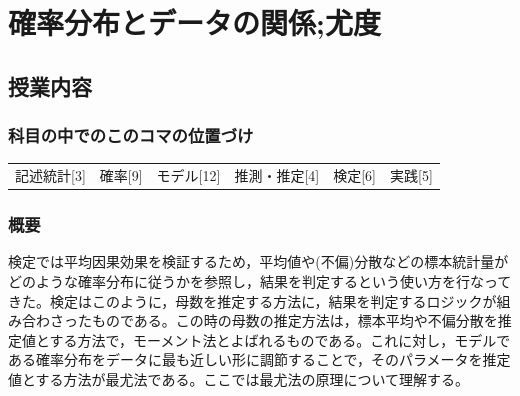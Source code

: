 \section{確率分布とデータの関係;尤度}
\label{s23_likelihood}

\subsection{授業内容}
\subsubsection{科目の中でのこのコマの位置づけ}
\begin{tabular}[t]{cccccc}
	記述統計[3] & 確率[9] & モデル[12] & 推測・推定[4] & 検定[6] & 実践[5]
\end{tabular}

\subsubsection{概要}
検定では平均因果効果を検証するため，平均値や(不偏)分散などの標本統計量がどのような確率分布に従うかを参照し，結果を判定するという使い方を行なってきた。検定はこのように，母数を推定する方法に，結果を判定するロジックが組み合わさったものである。この時の母数の推定方法は，標本平均や不偏分散を推定値とする方法で，モーメント法とよばれるものである。これに対し，モデルである確率分布をデータに最も近しい形に調節することで，そのパラメータを推定値とする方法が最尤法である。ここでは最尤法の原理について理解する。
